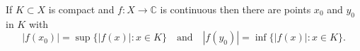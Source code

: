 If $K \subset X$ is compact and $f: X \to \mathbb{C}$ is continuous then there are points $x_0$ and $y_0$ in $K$ with
$$|f(x_0)| = \sup \{|f(x)|: x \in K\} \quad \text{and} \quad |f(y_0)| = \inf \{|f(x)|: x \in K\}.$$
